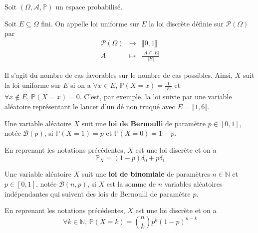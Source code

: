 
  Soit $(\Omega, \mathcal{A}, \mathbb{P})$ un espace probabilisé.

  \begin{definition}
    Soit $E \subseteq \Omega$ fini. On appelle loi uniforme sur $E$ la loi discrète définie sur $\mathcal{P}(\Omega)$ par
    \[
    \begin{array}{ccc}
      \mathcal{P}(\Omega) &\rightarrow& \llbracket 0, 1 \rrbracket \\
      A &\mapsto& \frac{\vert A \, \cap \, E \vert}{\vert E \vert}
    \end{array}
    \]
  \end{definition}

  \begin{remark}
    Il s'agit du nombre de cas favorables sur le nombre de cas possibles. Ainsi, $X$ suit la loi uniforme sur $E$ si on a $\forall x \in E, \, \mathbb{P}(X=x) = \frac{1}{\vert E \vert}$ et $\forall x \notin E, \, \mathbb{P}(X=x) = 0$.
    \newpar
    C'est, par exemple, la loi suivie par une variable aléatoire représentant le lancer d'un dé non truqué avec $E = \llbracket 1, 6 \rrbracket$.
  \end{remark}

  \begin{definition}
    Une variable aléatoire $X$ suit une \textbf{loi de Bernoulli} de paramètre $p \in [0,1]$, notée $\mathcal{B}(p)$, si $\mathbb{P}(X=1) = p$ et $\mathbb{P}(X=0)=1-p$.
  \end{definition}

  \begin{proposition}
    En reprenant les notations précédentes, $X$ est une loi discrète et on a
    \[ \mathbb{P}_X = (1-p) \delta_0 + p \delta_1 \]
  \end{proposition}

  \begin{definition}
    Une variable aléatoire $X$ suit une \textbf{loi de binomiale} de paramètres $n \in \mathbb{N}$ et $p \in [0,1]$, notée $\mathcal{B}(n, p)$, si $X$ est la somme de $n$ variables aléatoires indépendantes qui suivent des lois de Bernoulli de paramètre $p$.
  \end{definition}

  \begin{proposition}
    En reprenant les notations précédentes, $X$ est une loi discrète et on a
    \[ \forall k \in \mathbb{N}, \, \mathbb{P}(X = k) = \binom{n}{k} p^k (1-p)^{n-k} \]
  \end{proposition}

